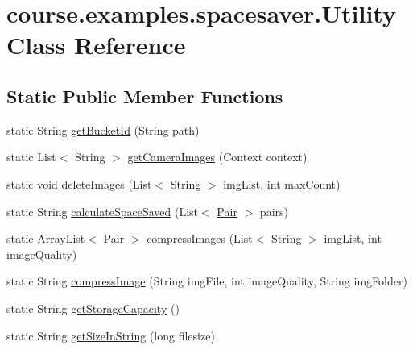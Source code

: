 \hypertarget{classcourse_1_1examples_1_1spacesaver_1_1_utility}{}\section{course.\+examples.\+spacesaver.\+Utility Class Reference}
\label{classcourse_1_1examples_1_1spacesaver_1_1_utility}
\subsection*{Static Public Member Functions}
\begin{DoxyCompactItemize}
\item 
static String \hyperlink{classcourse_1_1examples_1_1spacesaver_1_1_utility_afb38a3ff9ea902240c74adad9d975b80}{get\+Bucket\+Id} (String path)
\item 
static List$<$ String $>$ \hyperlink{classcourse_1_1examples_1_1spacesaver_1_1_utility_a7d516823eb324565737ea69a39e604f9}{get\+Camera\+Images} (Context context)
\item 
static void \hyperlink{classcourse_1_1examples_1_1spacesaver_1_1_utility_a534b914baf6a7ef4d7f681a7d56e4da6}{delete\+Images} (List$<$ String $>$ img\+List, int max\+Count)
\item 
static String \hyperlink{classcourse_1_1examples_1_1spacesaver_1_1_utility_a6e99256bde02985ef71df62265c56217}{calculate\+Space\+Saved} (List$<$ \hyperlink{classcourse_1_1examples_1_1spacesaver_1_1_pair}{Pair} $>$ pairs)
\item 
static Array\+List$<$ \hyperlink{classcourse_1_1examples_1_1spacesaver_1_1_pair}{Pair} $>$ \hyperlink{classcourse_1_1examples_1_1spacesaver_1_1_utility_a5029adf50e50346e2bb08bb1557ed064}{compress\+Images} (List$<$ String $>$ img\+List, int image\+Quality)
\item 
static String \hyperlink{classcourse_1_1examples_1_1spacesaver_1_1_utility_a8f1697a3c166596b60f83c21d23162fb}{compress\+Image} (String img\+File, int image\+Quality, String img\+Folder)
\item 
static String \hyperlink{classcourse_1_1examples_1_1spacesaver_1_1_utility_a52b2d0846affd9ee60328055d871f4df}{get\+Storage\+Capacity} ()
\item 
static String \hyperlink{classcourse_1_1examples_1_1spacesaver_1_1_utility_aba39539a00ba3e4d7c74198092926dee}{get\+Size\+In\+String} (long filesize)
\end{DoxyCompactItemize}

